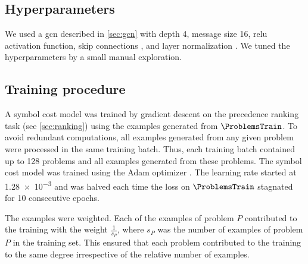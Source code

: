 \subsection{Hyperparameters}

We used a \gls{gcn} described in \cref{sec:gcn}
with depth 4, message size 16, \gls{relu} activation function,
skip connections \cite{Zhou2018}, and layer normalization \cite{Ba2016}.
We tuned the hyperparameters by a small manual exploration.

\subsection{Training procedure}

A symbol cost model was trained by gradient descent
on the precedence ranking task (see \cref{sec:ranking})
using the examples generated from $\ProblemsTrain$.
To avoid redundant computations, all examples generated from any given problem were processed in the same training batch.
Thus, each training batch contained up to \num{128} problems and all examples generated from these problems.
The symbol cost model was trained using the Adam optimizer \cite{Kingma2014}.
The learning rate started at \num{1.28e-3}
and was halved each time the loss on $\ProblemsTrain$ stagnated for 10 consecutive epochs.

The examples were weighted.
Each of the examples of problem $P$ contributed to the training with the weight $\frac{1}{s_P}$,
where $s_P$ was the number of examples of problem $P$ in the training set.
This ensured that each problem contributed to the training to the same degree irrespective of the relative number of examples.


